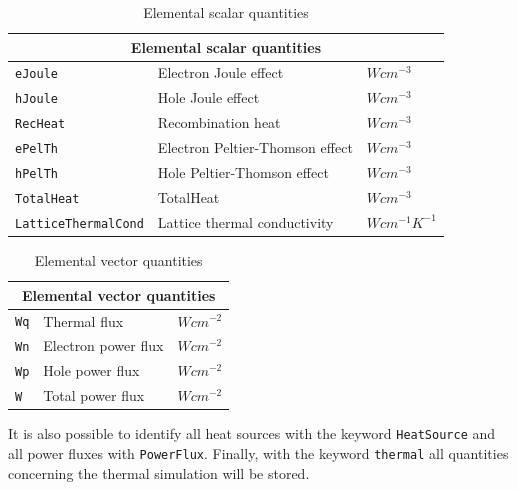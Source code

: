 \begin{table}[htb]
\center
\begin{tabular}{l|l|l}
\multicolumn{3}{c}{\textbf{Elemental scalar quantities}} \\
\hline 
\texttt{eJoule}     & Electron Joule effect               & $Wcm^{-3}$ \\
\texttt{hJoule}     & Hole Joule effect                   & $Wcm^{-3}$ \\
\texttt{RecHeat}    & Recombination heat                  & $Wcm^{-3}$ \\
\texttt{ePelTh}     & Electron Peltier-Thomson effect     & $Wcm^{-3}$ \\
\texttt{hPelTh}     & Hole Peltier-Thomson effect         & $Wcm^{-3}$ \\
\texttt{TotalHeat}  & TotalHeat                           & $Wcm^{-3}$ \\
\texttt{LatticeThermalCond}  & Lattice thermal conductivity    & $Wcm^{-1}K^{-1}$ \\
\end{tabular}
\caption{Elemental scalar quantities}
\label{table:tt_scalar_elemental}
\end{table}

\begin{table}[htb]
\center
\begin{tabular}{l|l|l}
\multicolumn{3}{c}{\textbf{Elemental vector quantities}} \\
\hline 
\texttt{Wq}      & Thermal flux                     & $Wcm^{-2}$ \\
\texttt{Wn}      & Electron power flux              & $Wcm^{-2}$ \\
\texttt{Wp}      & Hole power flux                  & $Wcm^{-2}$ \\
\texttt{W}       & Total power flux                 & $Wcm^{-2}$ \\
\end{tabular}
\caption{Elemental vector quantities}
\label{table:tt_vector_elemental}
\end{table}




It is also possible to identify all heat sources with the keyword \texttt{HeatSource} and  all power fluxes with \texttt{PowerFlux}.
Finally, with the keyword \texttt{thermal} all quantities concerning the thermal simulation will be stored.
